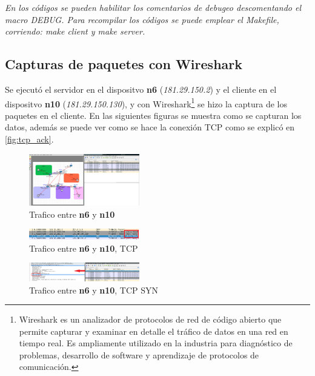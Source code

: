 \documentclass[letterpaper, 10 pt, conference]{ieeeconf}  %
\begin{document}
\textit{En los códigos se pueden habilitar los comentarios de debugeo descomentando el macro DEBUG. Para recompilar los códigos se puede emplear el Makefile, corriendo: make client y make server.}

\subsection{Capturas de paquetes con Wireshark}

Se ejecutó el servidor en el dispositvo \textbf{n6} (\textit{181.29.150.2}) y el cliente en el dispositvo \textbf{n10} (\textit{181.29.150.130}), y con Wireshark\footnote{Wireshark es un analizador de protocolos de red de código abierto que permite capturar y examinar en detalle el tráfico de datos en una red en tiempo real. Es ampliamente utilizado en la industria para diagnóstico de problemas, desarrollo de software y aprendizaje de protocolos de comunicación.} se hizo la captura de los paquetes en el cliente. En las siguientes figuras se muestra como se capturan los datos, además se puede ver como se hace la conexión TCP como se explicó en \ref{fig:tcp_ack}.

\begin{figure}[H]
	\centering
	\includegraphics[width=0.43\textwidth]{./Imagenes/captura_wireshark_n6_n10.png}
	\caption{Trafico entre \textbf{n6} y \textbf{n10}}
	\label{fig:wireshark_n6_n10}
\end{figure}

\begin{figure}[H]
	\centering
	\includegraphics[width=0.43\textwidth]{./Imagenes/trafico0.png}
	\caption{Trafico entre \textbf{n6} y \textbf{n10}, TCP}
	\label{fig:wireshark_0}
\end{figure}

\begin{figure}[H]
	\centering
	\includegraphics[width=0.43\textwidth]{./Imagenes/trafico1.png}
	\caption{Trafico entre \textbf{n6} y \textbf{n10}, TCP SYN}
	\label{fig:wireshark_1}
\end{figure}
\end{document}
